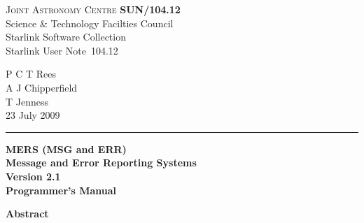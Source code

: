 \documentclass[twoside,11pt]{article}
\newcommand{\stardoccategory}  {Starlink User Note}
\newcommand{\stardocinitials}  {SUN}
\newcommand{\stardocnumber}    {104.12}
\newcommand{\stardocauthors}   {P C T Rees \\
                                A J Chipperfield \\
                                T Jenness}
\newcommand{\stardocdate}      {23 July 2009}
\newcommand{\stardoctitle}     {MERS (MSG and ERR)\\ [1ex]
                                Message and Error Reporting Systems}
\newcommand{\stardocversion}   {Version 2.1}
\newcommand{\stardocmanual}    {Programmer's Manual}
\newcommand{\stardocname}{\stardocinitials /\stardocnumber}
\newenvironment{latexonly}{}{}
\renewcommand{\_}{\texttt{\symbol{95}}}
\begin{document}
\thispagestyle{empty}

\begin{latexonly}
   \textsc{Joint Astronomy Centre} \hfill \textbf{\stardocname}\\
   {\large Science \& Technology Facilties Council}\\
   {\large Starlink Software Collection\\}
   {\large \stardoccategory\ \stardocnumber}
   \begin{flushright}
   \stardocauthors\\
   \stardocdate
   \end{flushright}
   \vspace{-4mm}
   \rule{\textwidth}{0.5mm}
   \vspace{5mm}
   \begin{center}
   {\Huge\textbf{\stardoctitle \\ [2.5ex]}}
   {\LARGE\textbf{\stardocversion \\ [4ex]}}
   {\Huge\textbf{\stardocmanual}}
   \end{center}
   \vspace{5mm}


   \vspace{10mm}
   \begin{center}
      {\Large\textbf{Abstract}}
   \end{center}
\end{latexonly}
\end{document}
